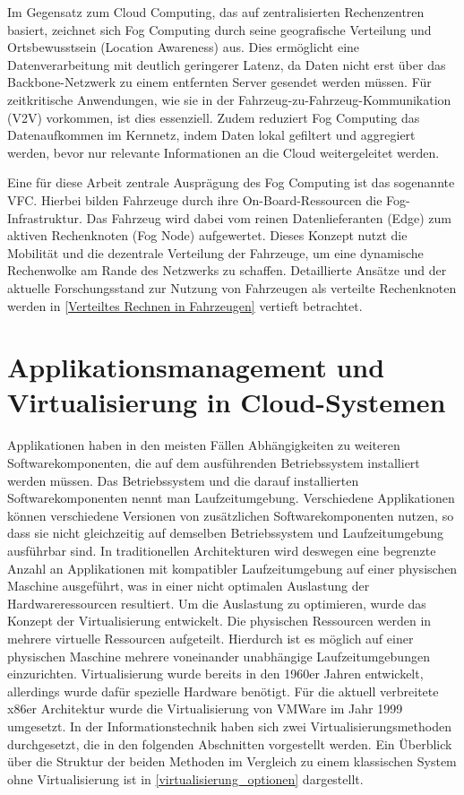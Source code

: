 Im Gegensatz zum Cloud Computing, das auf zentralisierten Rechenzentren basiert, zeichnet sich Fog Computing durch seine geografische Verteilung und Ortsbewusstsein (Location Awareness) aus. Dies ermöglicht eine Datenverarbeitung mit deutlich geringerer Latenz, da Daten nicht erst über das Backbone-Netzwerk zu einem entfernten Server gesendet werden müssen. Für zeitkritische Anwendungen, wie sie in der Fahrzeug-zu-Fahrzeug-Kommunikation (V2V) vorkommen, ist dies essenziell. Zudem reduziert Fog Computing das Datenaufkommen im Kernnetz, indem Daten lokal gefiltert und aggregiert werden, bevor nur relevante Informationen an die Cloud weitergeleitet werden. \cite{Yi2015}

Eine für diese Arbeit zentrale Ausprägung des Fog Computing ist das sogenannte \gls{VFC}. Hierbei bilden Fahrzeuge durch ihre On-Board-Ressourcen die Fog-Infrastruktur. Das Fahrzeug wird dabei vom reinen Datenlieferanten (Edge) zum aktiven Rechenknoten (Fog Node) aufgewertet. \cite{Hou2016} Dieses Konzept nutzt die Mobilität und die dezentrale Verteilung der Fahrzeuge, um eine dynamische Rechenwolke am Rande des Netzwerks zu schaffen. Detaillierte Ansätze und der aktuelle Forschungsstand zur Nutzung von Fahrzeugen als verteilte Rechenknoten werden in \autoref{Verteiltes Rechnen in Fahrzeugen} vertieft betrachtet.

\section{Applikationsmanagement und Virtualisierung in Cloud-Systemen}
\label{Applikationsmanagement}

Applikationen haben in den meisten Fällen Abhängigkeiten zu weiteren Softwarekomponenten, die auf dem ausführenden Betriebssystem installiert werden müssen. Das Betriebssystem und die darauf installierten Softwarekomponenten nennt man Laufzeitumgebung. Verschiedene Applikationen können verschiedene Versionen von zusätzlichen Softwarekomponenten nutzen, so dass sie nicht gleichzeitig auf demselben Betriebssystem und Laufzeitumgebung ausführbar sind. In traditionellen Architekturen wird deswegen eine begrenzte Anzahl an Applikationen mit kompatibler Laufzeitumgebung auf einer physischen Maschine ausgeführt, was in einer nicht optimalen Auslastung der Hardwareressourcen resultiert. Um die Auslastung zu optimieren, wurde das Konzept der Virtualisierung entwickelt. Die physischen Ressourcen werden in mehrere virtuelle Ressourcen aufgeteilt. Hierdurch ist es möglich auf einer physischen Maschine mehrere voneinander unabhängige Laufzeitumgebungen einzurichten. Virtualisierung wurde bereits in den 1960er Jahren entwickelt, allerdings wurde dafür spezielle Hardware benötigt. Für die aktuell verbreitete x86er Architektur wurde die Virtualisierung von VMWare im Jahr 1999 umgesetzt. \cite{Bugnion2012} In der Informationstechnik haben sich zwei Virtualisierungsmethoden durchgesetzt, die in den folgenden Abschnitten vorgestellt werden. Ein Überblick über die Struktur der beiden Methoden im Vergleich zu einem klassischen System ohne Virtualisierung ist in \autoref{virtualisierung_optionen} dargestellt.

